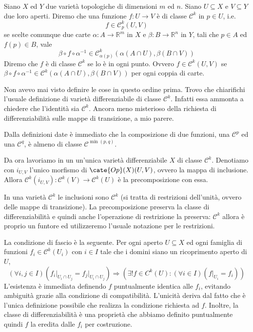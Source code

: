 Siano $X$ ed $Y$ due varietà topologiche di dimensioni $m$ ed $n$.
Siano $U\subseteq X$ e $V\subseteq Y$ due loro aperti.
Diremo che una funzione $f\colon U\to V$ è di classe $\mathcal C^k$ in $p\in U$, i.e.
\[ f\in\mathcal C^k_p(U,V) \]
se scelte comunque due carte $\alpha\colon A\to\mathbb R^m$ in $X$ e $\beta\colon B\to\mathbb R^n$ in $Y$, tali che $p\in A$ ed $f(p)\in B$, vale
\[ \beta\circ f\circ\alpha^{-1}\in\mathcal C^k_{\alpha(p)}(\alpha(A\cap U),\beta(B\cap V)) \]
Diremo che $f$ è di classe $\mathcal C^k$ se lo è in ogni punto.
Ovvero $f\in\mathcal C^k(U,V)$ se $\beta\circ f\circ\alpha^{-1}\in\mathcal C^k(\alpha(A\cap U),\beta(B\cap V))$ per ogni coppia di carte.

Non avevo mai visto definire le cose in questo ordine prima.
Trovo che chiarifichi l'usuale definizione di varietà differenziabile di classe $\mathcal C^k$.
Infatti essa ammonta a chiedere che l'identità sia $\mathcal C^k$.
Ancora meno misterioso della richiesta di differenziabilità sulle mappe di transizione, a mio parere.

Dalla definizioni date è immediato che la composizione di due funzioni, una $\mathcal C^p$ ed una $\mathcal C^q$, è almeno di classe $\mathcal C^{\min(p,q)}$.

Da ora lavoriamo in un un'unica varietà differenziabile $X$ di classe $\mathcal C^k$.
Denotiamo con $i_{U,V}$ l'unico morfismo di $\cate{Op}(X)(U,V)$, ovvero la mappa di inclusione.
Allora $\mathcal C^k(i_{U,V})\colon \mathcal C^k(V)\to \mathcal C^k(U)$ è la precomposizione con essa.

In una varietà $\mathcal C^k$ le inclusioni sono $\mathcal C^k$ (si tratta di restrizioni dell'unità, ovvero delle mappe di transizione). La precomposizione preserva la classe di differenziabilità e quindi anche l'operazione di restrizione la preserva: $\mathcal C^k$ allora è proprio un funtore ed utilizzeremo l'usuale notazione per le restrizioni.

La condizione di fascio è la seguente. Per ogni aperto $U\subseteq X$ ed ogni famiglia di funzioni $f_i\in\mathcal C^k(U_i)$ con $i\in I$ tale che i domini siano un ricoprimento aperto di $U$,
\[
(\forall i,j\in I) \left(f_i\vert_{U_i\cap U_j}=f_j\vert_{U_i\cap U_j}\right) \Rightarrow (\exists! f\in C^k(U)\colon (\forall i\in I)(f\vert_{U_i}=f_i))
\]
L'esistenza è immediata definendo $f$ puntualmente identica alle $f_i$, evitando ambiguità grazie alla condizione di compatibilità.
L'unicità deriva dal fatto che è l'unica definizione possibile che realizza la condizione richiesta ad $f$.
Inoltre, la classe di differenziabilità è una proprietà che abbiamo definito puntualmente quindi $f$ la eredita dalle $f_i$ per costruzione.

